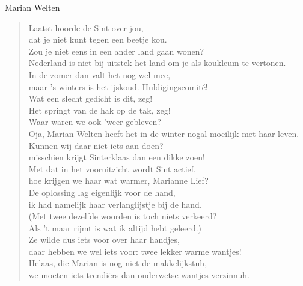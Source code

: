 \documentclass[12pt]{brief}
\date{4 december 2004}
\begin{document}
\begin{letter}{Marian Welten}

\opening{}


\begin{verse}

Laatst hoorde de Sint over jou,\\
dat je niet kunt tegen een beetje kou.\\[0.5em]

Zou je niet eens in een ander land gaan wonen?\\
Nederland is niet bij uitstek het land om je als koukleum te vertonen.\\[0.5em]

In de zomer dan valt het nog wel mee,\\
maar 's winters is het ijskoud. Huldigingscomit\'e!\\[0.5em]

Wat een slecht gedicht is dit, zeg!\\
Het springt van de hak op de tak, zeg!\\[2em]

Waar waren we ook 'weer gebleven?\\
Oja, Marian Welten heeft het in de winter nogal moeilijk met haar
leven.\\[0.5em]

Kunnen wij daar niet iets aan doen?\\
misschien krijgt Sinterklaas dan een dikke zoen!\\[0.5em]

Met dat in het vooruitzicht wordt Sint actief,\\
hoe krijgen we haar wat warmer, Marianne Lief?\\[2em]

De oplossing lag eigenlijk voor de hand,\\
ik had namelijk haar verlanglijstje bij de hand.\\[2em]

(Met twee dezelfde woorden is toch niets verkeerd?\\
Als 't maar rijmt is wat ik altijd hebt geleerd.)\\[2em]

Ze wilde dus iets voor over haar handjes,\\
daar hebben we wel iets voor: twee lekker warme wantjes!\\[0.5em]

Helaas, die Marian is nog niet de makkelijkstuh,\\
we moeten iets trendi\"ers dan ouderwetse wantjes verzinnuh.\\[0.5em]


\end{verse}
\end{letter}
\end{document}
